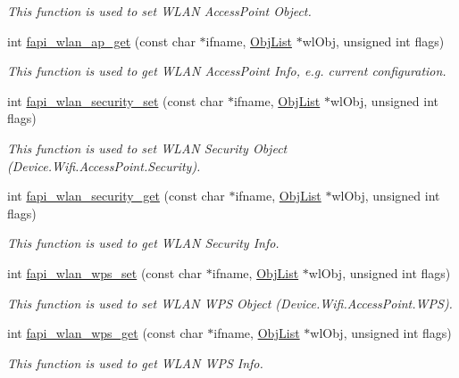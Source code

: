 \begin{DoxyCompactItemize}
\begin{DoxyCompactList}\small\item\em This function is used to set W\-L\-A\-N Access\-Point Object. \end{DoxyCompactList}\item 
int \hyperlink{group__FAPI__WLAN_ga073fc4b9d8a2a75af007bd759fdbff5c}{fapi\-\_\-wlan\-\_\-ap\-\_\-get} (const char $\ast$ifname, \hyperlink{structObjList}{Obj\-List} $\ast$wl\-Obj, unsigned int flags)
\begin{DoxyCompactList}\small\item\em This function is used to get W\-L\-A\-N Access\-Point Info, e.\-g. current configuration. \end{DoxyCompactList}\item 
int \hyperlink{group__FAPI__WLAN_gaada84313389fa37992ebbd0806bb0aa6}{fapi\-\_\-wlan\-\_\-security\-\_\-set} (const char $\ast$ifname, \hyperlink{structObjList}{Obj\-List} $\ast$wl\-Obj, unsigned int flags)
\begin{DoxyCompactList}\small\item\em This function is used to set W\-L\-A\-N Security Object (Device.\-Wifi.\-Access\-Point.\-Security). \end{DoxyCompactList}\item 
int \hyperlink{group__FAPI__WLAN_ga05a9d676241710985c6f295b32ea600c}{fapi\-\_\-wlan\-\_\-security\-\_\-get} (const char $\ast$ifname, \hyperlink{structObjList}{Obj\-List} $\ast$wl\-Obj, unsigned int flags)
\begin{DoxyCompactList}\small\item\em This function is used to get W\-L\-A\-N Security Info. \end{DoxyCompactList}\item 
int \hyperlink{group__FAPI__WLAN_gab50168998ee227f14a464feb0585f37c}{fapi\-\_\-wlan\-\_\-wps\-\_\-set} (const char $\ast$ifname, \hyperlink{structObjList}{Obj\-List} $\ast$wl\-Obj, unsigned int flags)
\begin{DoxyCompactList}\small\item\em This function is used to set W\-L\-A\-N W\-P\-S Object (Device.\-Wifi.\-Access\-Point.\-W\-P\-S). \end{DoxyCompactList}\item 
int \hyperlink{group__FAPI__WLAN_gab3f24081ae9f410ce5aa01a32be4240c}{fapi\-\_\-wlan\-\_\-wps\-\_\-get} (const char $\ast$ifname, \hyperlink{structObjList}{Obj\-List} $\ast$wl\-Obj, unsigned int flags)
\begin{DoxyCompactList}\small\item\em This function is used to get W\-L\-A\-N W\-P\-S Info. \end{DoxyCompactList}\item 

\end{DoxyCompactItemize}
